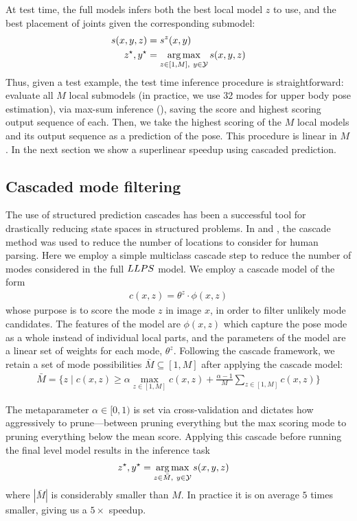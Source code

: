 At test time, the full \LLPS models infers both the best local model $z$ to 
use, and the best placement of joints given the corresponding submodel:
\begin{align}
s(x,y,z) &= s^z(x,y) \\
z^\star,y^\star &= \mathop{\arg\max}_{z \in [1,M],~y \in \mathcal{Y}} s(x,y,z) 
\end{align}
Thus, given a test example, the test time inference procedure is 
straightforward: evaluate all $M$ local submodels (in practice, we use 32 modes 
for upper body pose estimation), via max-sum inference (), 
saving the score and highest scoring output sequence of each.  Then, we take 
the highest scoring of the $M$ local models and its output sequence as a 
prediction of the pose.  This procedure is linear in $M$.  In the next section 
we show a superlinear speedup using cascaded prediction.

\subsection{Cascaded mode filtering}

The use of structured prediction cascades has been a successful tool for 
drastically reducing state spaces in structured problems.  In  and 
, the cascade method was used to reduce
the number of locations to consider for human parsing.  Here we employ a simple 
multiclass cascade step to reduce the number of modes considered in the full 
$LLPS$ model. We employ a cascade model of the form \begin{align}
c(x,z) = \theta^z \cdot \phi(x,z)
\end{align}
whose purpose is to score the mode $z$ in image $x$, in order to filter 
unlikely mode candidates.  The features of the model are $\phi(x,z)$ which 
capture the pose mode as a whole instead of individual local parts, and the 
parameters of the model are a linear set of weights for each mode, $\theta^z$.  
Following the cascade framework, we retain a set of mode possibilities $\bar{M} 
\subseteq [1,M]$ after applying the cascade model:
\begin{align}
\bar{M} = \{ z \;|\; c(x,z) \geq \alpha \max_{z \in [1,M]} c(x,z) + 
\frac{\alpha-1}{M} \sum_{z \in [1,M]} c(x,z) \}
\end{align}

The metaparameter $\alpha \in [0,1)$ is set via cross-validation and dictates 
how aggressively to prune---between pruning everything but the max scoring mode 
to pruning everything below the mean score.  Applying this cascade before 
running the final level \LLPS model results in the inference task
\begin{align}
z^\star,y^\star &= \mathop{\arg\max}_{z \in \bar{M},~y \in \mathcal{Y}} s(x,y,z) 
\end{align}
where $|\bar{M}|$ is considerably smaller than $M$.  In practice it is on 
average $5$ times smaller, giving us a $5\times$ speedup.

